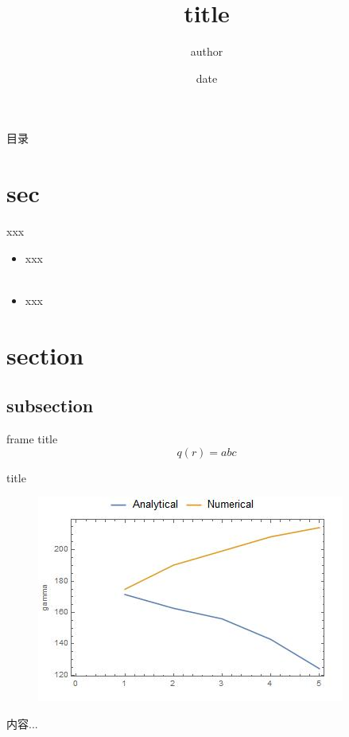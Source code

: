 \documentclass[xcolor=svgnames,serif,table,10pt]{beamer}
\begin{document}
	\title{title}
	\author{author}
	
	\date{date}
	
\begin{frame}
		\titlepage
\end{frame}
\begin{frame}{目录}
	\tableofcontents
\end{frame}
\section{sec}

\begin{frame}{xxx}
	\begin{itemize}
		\item xxx
		~\\
		~\\
		\item xxx

	\end{itemize}
\end{frame}
\section{section}


\subsection{subsection}
\begin{frame}{frame title}
	\begin{equation*}
		q(r)= abc
	\end{equation*}
	
	
\end{frame}

\begin{frame}{title}
	\begin{figure}
		\centering
		\includegraphics[width=0.7\linewidth]{image/compared}
		\label{fig:c}
	\end{figure}
	内容...
\end{frame}
\end{document}
